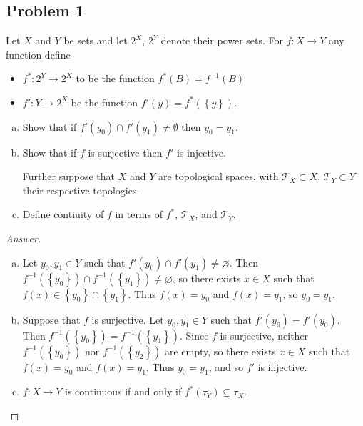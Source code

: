 \documentclass[12pt]{article}
\newcommand\inv[1]{#1^{-1}}
\newcommand\paren[1]{\left( #1 \right)}
\newcommand\setb[1]{\left \{ #1 \right \}}
\theoremstyle{definition}
\begin{document}
\subsection{Problem 1}
Let $X$ and $Y$ be sets and let $2^X$, $2^Y$ denote their power sets. For $f : X \to Y$ any function define
\begin{itemize}
    \item $f^* : 2^Y \to 2^X$ to be the function $f^*(B) = \inv{f}(B)$
    \item $f' : Y \to 2^X$ be the function $f'(y) = f^* \paren{ \setb{ y } }$.
\end{itemize}
\begin{enumerate}[(a)]
    \item Show that if $f'(y_0) \cap f'(y_1) \neq \emptyset$ then $y_0 = y_1$.
    \item Show that if $f$ is surjective then $f'$ is injective.
    
    Further suppose that $X$ and $Y$ are topological spaces, with $\mathcal{T}_X \subset X$, $\mathcal{T}_Y \subset Y$ their respective topologies.
    \item Define contiuity of $f$ in terms of $f^*$, $\mathcal{T}_X$, and $\mathcal{T}_Y$.
\end{enumerate}
\begin{proof}[Answer]
    \noindent
    \begin{enumerate}[(a)]
        \item Let $y_0 , y_1 \in Y$ such that $f' \paren{ y_0 } \cap f' \paren{ y_1 } \neq \varnothing$. Then $\inv{f} \paren{ \setb{ y_0 } }  \cap \inv{f} \paren{ \setb{ y_1 } } \neq \varnothing$, so there exists $x \in X$ such that $f(x) \in \setb{ y_0 } \cap \setb{ y_1 }$. Thus $f(x) = y_0$ and $f(x) = y_1$, so $y_0 = y_1$.
        \item Suppose that $f$ is surjective. Let $y_0 , y_1 \in Y$ such that $f' \paren{ y_0 } = f' \paren{ y_0 }$. Then $\inv{f} \paren{ \setb{ y_0 } } = \inv{f} \paren{ \setb{ y_1 } }$. Since $f$ is surjective, neither $\inv{f} \paren{ \setb{ y_0 } }$ nor $\inv{f} \paren{ \setb{ y_2 } }$ are empty, so there exists $x \in X$ such that $f(x) = y_0$ and $f(x) = y_1$. Thus $y_0 = y_1$, and so $f'$ is injective.
        \item $f : X \to Y$ is continuous if and only if $f^* \paren{ \tau_Y } \subseteq \tau_X$.
    \end{enumerate}
\end{proof}
\end{document}
